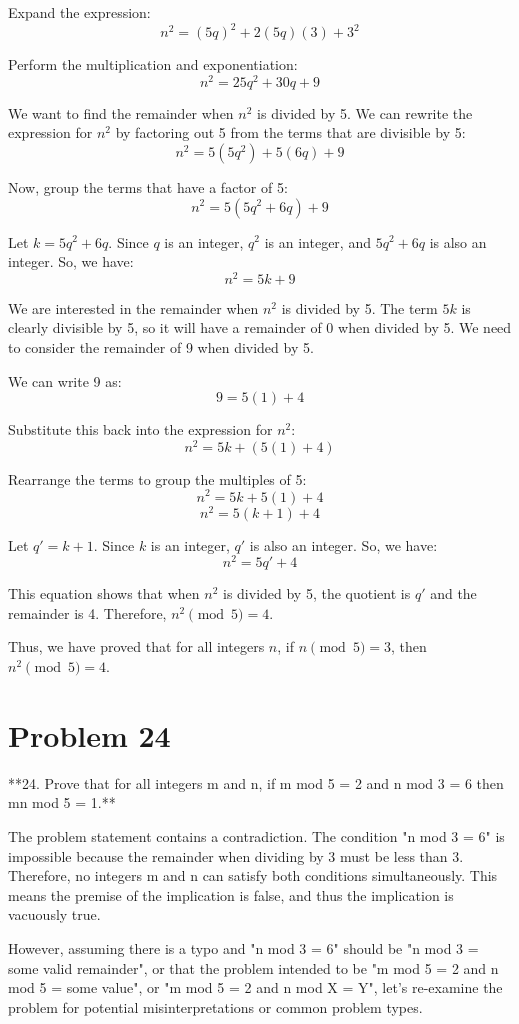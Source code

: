 \documentclass{article}
\begin{document}
Expand the expression:
$$n^2 = (5q)^2 + 2(5q)(3) + 3^2$$

Perform the multiplication and exponentiation:
$$n^2 = 25q^2 + 30q + 9$$

We want to find the remainder when $n^2$ is divided by 5. We can rewrite the expression for $n^2$ by factoring out 5 from the terms that are divisible by 5:
$$n^2 = 5(5q^2) + 5(6q) + 9$$

Now, group the terms that have a factor of 5:
$$n^2 = 5(5q^2 + 6q) + 9$$

Let $k = 5q^2 + 6q$. Since $q$ is an integer, $q^2$ is an integer, and $5q^2 + 6q$ is also an integer.
So, we have:
$$n^2 = 5k + 9$$

We are interested in the remainder when $n^2$ is divided by 5. The term $5k$ is clearly divisible by 5, so it will have a remainder of 0 when divided by 5. We need to consider the remainder of 9 when divided by 5.

We can write 9 as:
$$9 = 5(1) + 4$$

Substitute this back into the expression for $n^2$:
$$n^2 = 5k + (5(1) + 4)$$

Rearrange the terms to group the multiples of 5:
$$n^2 = 5k + 5(1) + 4$$
$$n^2 = 5(k + 1) + 4$$

Let $q' = k + 1$. Since $k$ is an integer, $q'$ is also an integer.
So, we have:
$$n^2 = 5q' + 4$$

This equation shows that when $n^2$ is divided by 5, the quotient is $q'$ and the remainder is 4.
Therefore, $n^2 \pmod{5} = 4$.

Thus, we have proved that for all integers $n$, if $n \pmod{5} = 3$, then $n^2 \pmod{5} = 4$.

\newpage

\section*{Problem 24}
**24. Prove that for all integers m and n, if m mod 5 = 2 and n mod 3 = 6 then mn mod 5 = 1.**

The problem statement contains a contradiction. The condition "n mod 3 = 6" is impossible because the remainder when dividing by 3 must be less than 3. Therefore, no integers m and n can satisfy both conditions simultaneously. This means the premise of the implication is false, and thus the implication is vacuously true.

However, assuming there is a typo and "n mod 3 = 6" should be "n mod 3 = some valid remainder", or that the problem intended to be "m mod 5 = 2 and n mod 5 = some value", or "m mod 5 = 2 and n mod X = Y", let's re-examine the problem for potential misinterpretations or common problem types.
\end{document}
